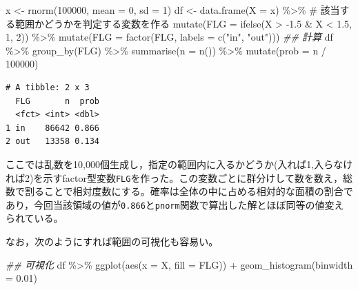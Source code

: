 \documentclass[
  a4paper,
]{ltjsbook}
\newenvironment{Shaded}{\begin{snugshade}}{\end{snugshade}}
\newcommand{\AttributeTok}[1]{\textcolor[rgb]{0.40,0.45,0.13}{#1}}
\newcommand{\CommentTok}[1]{\textcolor[rgb]{0.37,0.37,0.37}{#1}}
\newcommand{\DecValTok}[1]{\textcolor[rgb]{0.68,0.00,0.00}{#1}}
\newcommand{\DocumentationTok}[1]{\textcolor[rgb]{0.37,0.37,0.37}{\textit{#1}}}
\newcommand{\FloatTok}[1]{\textcolor[rgb]{0.68,0.00,0.00}{#1}}
\newcommand{\FunctionTok}[1]{\textcolor[rgb]{0.28,0.35,0.67}{#1}}
\newcommand{\NormalTok}[1]{\textcolor[rgb]{0.00,0.23,0.31}{#1}}
\newcommand{\OtherTok}[1]{\textcolor[rgb]{0.00,0.23,0.31}{#1}}
\newcommand{\SpecialCharTok}[1]{\textcolor[rgb]{0.37,0.37,0.37}{#1}}
\newcommand{\StringTok}[1]{\textcolor[rgb]{0.13,0.47,0.30}{#1}}
\begin{document}
\begin{Shaded}
\begin{Highlighting}[]
\NormalTok{x }\OtherTok{\textless{}{-}} \FunctionTok{rnorm}\NormalTok{(}\DecValTok{100000}\NormalTok{, }\AttributeTok{mean =} \DecValTok{0}\NormalTok{, }\AttributeTok{sd =} \DecValTok{1}\NormalTok{)}
\NormalTok{df }\OtherTok{\textless{}{-}} \FunctionTok{data.frame}\NormalTok{(}\AttributeTok{X =}\NormalTok{ x) }\SpecialCharTok{\%\textgreater{}\%}
  \CommentTok{\# 該当する範囲かどうかを判定する変数を作る}
  \FunctionTok{mutate}\NormalTok{(}\AttributeTok{FLG =} \FunctionTok{ifelse}\NormalTok{(X }\SpecialCharTok{\textgreater{}} \SpecialCharTok{{-}}\FloatTok{1.5} \SpecialCharTok{\&}\NormalTok{ X }\SpecialCharTok{\textless{}} \FloatTok{1.5}\NormalTok{, }\DecValTok{1}\NormalTok{, }\DecValTok{2}\NormalTok{)) }\SpecialCharTok{\%\textgreater{}\%}
  \FunctionTok{mutate}\NormalTok{(}\AttributeTok{FLG =} \FunctionTok{factor}\NormalTok{(FLG, }\AttributeTok{labels =} \FunctionTok{c}\NormalTok{(}\StringTok{"in"}\NormalTok{, }\StringTok{"out"}\NormalTok{)))}
\DocumentationTok{\#\# 計算}
\NormalTok{df }\SpecialCharTok{\%\textgreater{}\%}
  \FunctionTok{group\_by}\NormalTok{(FLG) }\SpecialCharTok{\%\textgreater{}\%}
  \FunctionTok{summarise}\NormalTok{(}\AttributeTok{n =} \FunctionTok{n}\NormalTok{()) }\SpecialCharTok{\%\textgreater{}\%}
  \FunctionTok{mutate}\NormalTok{(}\AttributeTok{prob =}\NormalTok{ n }\SpecialCharTok{/} \DecValTok{100000}\NormalTok{)}
\end{Highlighting}
\end{Shaded}

\begin{verbatim}
# A tibble: 2 x 3
  FLG       n  prob
  <fct> <int> <dbl>
1 in    86642 0.866
2 out   13358 0.134
\end{verbatim}

ここでは乱数を10,000個生成し，指定の範囲内に入るかどうか(入れば1,入らなければ2)を示すfactor型変数\texttt{FLG}を作った。この変数ごとに群分けして数を数え，総数で割ることで相対度数にする。確率は全体の中に占める相対的な面積の割合であり，今回当該領域の値が\texttt{0.866}と\texttt{pnorm}関数で算出した解とほぼ同等の値変えられている。

なお，次のようにすれば範囲の可視化も容易い。

\begin{Shaded}
\begin{Highlighting}[]
\DocumentationTok{\#\# 可視化}
\NormalTok{df }\SpecialCharTok{\%\textgreater{}\%}
  \FunctionTok{ggplot}\NormalTok{(}\FunctionTok{aes}\NormalTok{(}\AttributeTok{x =}\NormalTok{ X, }\AttributeTok{fill =}\NormalTok{ FLG)) }\SpecialCharTok{+}
  \FunctionTok{geom\_histogram}\NormalTok{(}\AttributeTok{binwidth =} \FloatTok{0.01}\NormalTok{)}
\end{Highlighting}
\end{Shaded}
\end{document}
